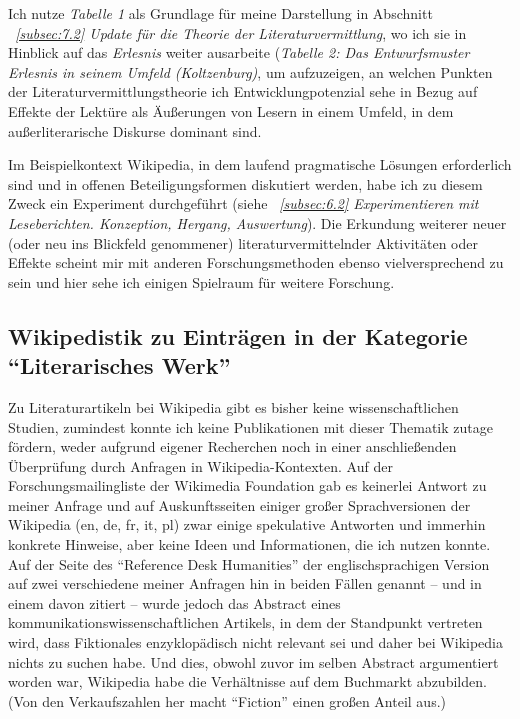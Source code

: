 \documentclass[fontsize=12pt]{scrartcl}
\begin{document}
Ich nutze \textit{Tabelle 1} als Grundlage f\"ur meine Darstellung in Abschnitt \textit{~\ref{subsec:7.2} Update f\"ur die Theorie der Li\-te\-ra\-tur\-ver\-mitt\-lung}, wo ich sie in Hinblick auf das \textit{Erlesnis} weiter ausarbeite (\textit{Tabelle 2: Das Entwurfsmuster \textit{Erlesnis} in seinem Umfeld (Kolt\-zen\-burg)}, um aufzuzeigen, an welchen Punkten der Li\-te\-ra\-tur\-ver\-mitt\-lungstheorie ich Entwicklungpotenzial sehe in Bezug auf Effekte der Lekt\"ure als \"Au{\ss}erungen von Lesern\textsuperscript{\tiny *} in einem Umfeld, in dem au{\ss}erli\-te\-ra\-rische Diskurse dominant sind. 

Im Beispielkontext Wi\-ki\-pe\-dia, in dem laufend pragmatische L\"osungen erforderlich sind und in offenen Beteiligungsformen diskutiert werden, habe ich zu diesem Zweck ein Experiment durchgef\"uhrt (siehe \textit{~\ref{subsec:6.2} Experimentieren mit Leseberichten. Konzeption, Hergang, Auswertung}). Die Erkundung weiterer neuer (oder neu ins Blickfeld genom\-me\-ner) li\-te\-ra\-tur\-vermittelnder Ak\-ti\-vi\-t\"aten oder Effekte scheint mir mit anderen For\-schungsmethoden ebenso vielversprechend zu sein und \mbox{hier} sehe ich einigen Spielraum f\"ur weitere For\-schung.

\subsection{Wikipedistik zu Eintr\"agen in der Kategorie "`Literarisches Werk"'}
\label{subsec:3.3}

Zu Li\-te\-ra\-tur\-artikeln bei Wi\-ki\-pe\-dia gibt es bis\-her keine wissenschaftlichen Studien, zumindest konnte ich keine Publikationen mit dieser Thematik zutage f\"ordern, we\-der aufgrund eigener Recherchen noch in einer anschlie{\ss}enden \"Uberpr\"ufung durch Anfragen in Wi\-ki\-pe\-dia-Kontexten. Auf der For\-schungsmailing\-liste der Wikimedia Foundation gab es keinerlei Antwort zu meiner Anfrage und auf Aus\-kunftssei\-ten einiger gro{\ss}er Sprachversionen der Wi\-ki\-pe\-dia (en, de, fr, it, pl) zwar einige spekulative Antworten und immerhin konkrete Hinweise, aber keine Ideen und Informationen, die ich nutzen konnte. Auf der Seite des "`Re\-fe\-rence Desk Humanities"' der eng\-lischspra\-chi\-gen Version auf zwei verschiedene meiner Anfragen hin in beiden F\"allen genannt -- und in einem davon zitiert -- wurde jedoch das Abstract eines kommunikationswissenschaftlichen Artikels, in dem der Standpunkt vertreten wird, dass Fiktionales enzy\-klop\"adisch nicht relevant sei und daher bei Wi\-ki\-pe\-dia nichts zu suchen habe. Und dies, obwohl zuvor im selben Abstract argumentiert worden war, Wi\-ki\-pe\-dia habe die Verh\"altnisse auf dem Buchmarkt abzubilden. (Von den Verkaufszahlen her macht "`Fiction"' einen gro{\ss}en Anteil aus.)
\end{document}
